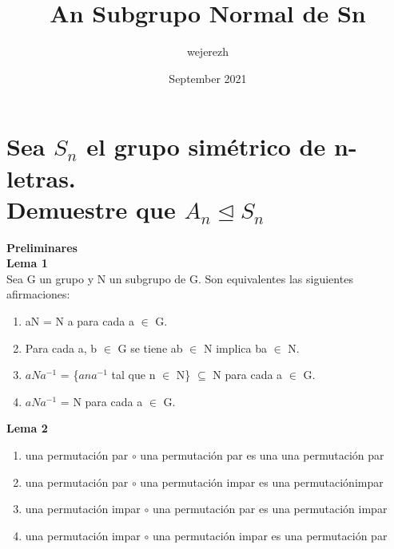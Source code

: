 \documentclass{article}
\title{An Subgrupo Normal de Sn}
\author{wejerezh }
\date{September 2021}
\begin{document}

\section{Sea $S_{n}$ el grupo simétrico de n-letras. \\ Demuestre que $A_{n} \trianglelefteq S_{n}$}
\textbf{Preliminares}\\
\textbf{Lema 1}\\
Sea G un grupo y N un subgrupo de G. Son equivalentes las siguientes afirmaciones:
\begin{enumerate}
    \item aN = N a para cada a $\in$ G.
    \item  Para cada a, b $\in$ G se tiene ab $\in$ N implica ba $\in$ N.
    \item $aNa^{-1}$ = \{$ana^{-1} $ tal que n $\in$ N\} $\subseteq$ N para cada a $\in$ G.
    \item $aNa^{-1}$ = N para cada a $\in$ G.
\end{enumerate}
\textbf{Lema 2}\\
\begin{enumerate}
    \item una permutación par $\circ $ una permutación par es una una permutación par
    \item una permutación par $\circ $  una permutación impar es una permutaciónimpar
    \item una permutación impar $\circ $ una permutación par es una permutación impar
    \item una permutación impar $\circ $ una permutación impar es una permutación par
    
\end{enumerate}
\end{document}
